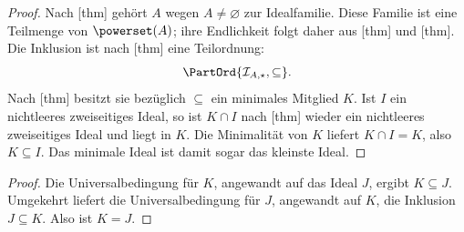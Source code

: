 \documentclass[main.tex]{subfiles}
\begin{document}
\begin{proof}
Nach [thm] gehört \(A\) wegen
\(A\neq\varnothing\) zur Idealfamilie.  Diese Familie ist eine Teilmenge von
\(\powerset(A)\); ihre Endlichkeit folgt daher aus
[thm] und
[thm]. Die Inklusion ist nach
[thm] eine Teilordnung:
\[
  \PartOrd{\mathcal I_{A,\star},\subseteq}.
\]
Nach
[thm] besitzt sie bezüglich
\(\subseteq\) ein minimales Mitglied \(K\).  Ist \(I\) ein nichtleeres
zweiseitiges Ideal, so ist \(K\cap I\) nach
[thm] wieder ein nichtleeres
zweiseitiges Ideal und liegt in \(K\).  Die Minimalität von \(K\) liefert
\(K\cap I=K\), also \(K\subseteq I\).  Das minimale Ideal ist damit sogar
das kleinste Ideal.
\end{proof}

\begin{proof}
Die Universalbedingung für \(K\), angewandt auf das Ideal \(J\), ergibt
\(K\subseteq J\).  Umgekehrt liefert die Universalbedingung für \(J\),
angewandt auf \(K\), die Inklusion \(J\subseteq K\).  Also ist \(K=J\).
\end{proof}
\end{document}
